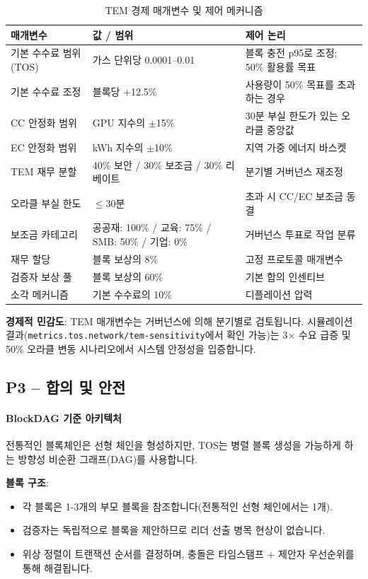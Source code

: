 \documentclass[11pt]{article}
\begin{document}
\begin{table}[H]
\centering
\caption{TEM 경제 매개변수 및 제어 메커니즘}
\label{tab:tem-parameters}
\begin{tabular}{@{}p{}p{}p{}@{}}
\toprule
\textbf{매개변수} & \textbf{값 / 범위} & \textbf{제어 논리} \\ \midrule
기본 수수료 범위 (TOS) & 가스 단위당 0.0001--0.01 & 블록 충전 p95로 조정; 50\% 활용률 목표 \\
기본 수수료 조정 & 블록당 +12.5\% & 사용량이 50\% 목표를 초과하는 경우 \\
CC 안정화 범위 & GPU 지수의 $\pm$15\% & 30분 부실 한도가 있는 오라클 중앙값 \\
EC 안정화 범위 & kWh 지수의 $\pm$10\% & 지역 가중 에너지 바스켓 \\
TEM 재무 분할 & 40\% 보안 / 30\% 보조금 / 30\% 리베이트 & 분기별 거버넌스 재조정 \\
오라클 부실 한도 & $\le$30분 & 초과 시 CC/EC 보조금 동결 \\
보조금 카테고리 & 공공재: 100\% / 교육: 75\% / SMB: 50\% / 기업: 0\% & 거버넌스 투표로 작업 분류 \\
재무 할당 & 블록 보상의 8\% & 고정 프로토콜 매개변수 \\
검증자 보상 풀 & 블록 보상의 60\% & 기본 합의 인센티브 \\
소각 메커니즘 & 기본 수수료의 10\% & 디플레이션 압력 \\
\bottomrule
\end{tabular}
\end{table}

\textbf{경제적 민감도}: TEM 매개변수는 거버넌스에 의해 분기별로 검토됩니다. 시뮬레이션 결과(\texttt{metrics.tos.network/tem-sensitivity}에서 확인 가능)는 3$\times$ 수요 급증 및 50\% 오라클 변동 시나리오에서 시스템 안정성을 입증합니다.

\subsection{P3 -- 합의 및 안전}
\label{sec:pillar-consensus}

\paragraph{BlockDAG 기준 아키텍처}
전통적인 블록체인은 선형 체인을 형성하지만, TOS는 병렬 블록 생성을 가능하게 하는 방향성 비순환 그래프(DAG)를 사용합니다.

\textbf{블록 구조}:
\begin{itemize}[noitemsep]
  \item 각 블록은 1-3개의 부모 블록을 참조합니다(전통적인 선형 체인에서는 1개).
  \item 검증자는 독립적으로 블록을 제안하므로 리더 선출 병목 현상이 없습니다.
  \item 위상 정렬이 트랜잭션 순서를 결정하며, 충돌은 타임스탬프 + 제안자 우선순위를 통해 해결됩니다.
\end{itemize}
\end{document}
